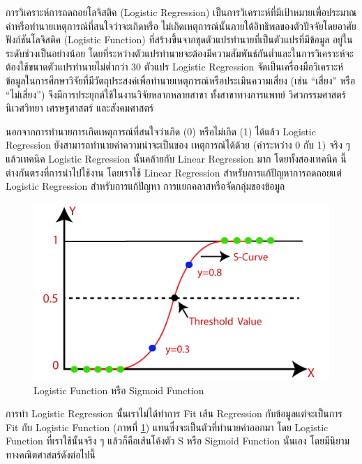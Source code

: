 การวิเคราะห์การถดถอยโลจิสติค (Logistic Regression) เป็นการวิเคราะห์ที่มีเป้าหมายเพื่อประมาณค่าหรือทํานายเหตุการณ์ที่สนใจว่าจะเกิดหรือ%
ไม่เกิดเหตุการณ์นั้นภายใต้อิทธิพลของตัวปัจจัยโดยอาศัยฟังก์ชันโลจิสติค (Logistic Function) ที่สร้างขึ้นจากชุดตัวแปรทำนายที่เป็นตัวแปรที่มีข้อมูล%
อยู่ในระดับช่วงเป็นอย่างน้อย โดยที่ระหว่างตัวแปรทำนายจะต้องมีความสัมพันธ์กันต่ำและในการวิเคราะห์จะต้องใช้ขนาดตัวแปรทำนายไม่ต่ำกว่า 30
ตัวแปร Logistic Regression จัดเป็นเครื่องมือวิเคราะห์ข้อมูลในการศึกษาวิจัยที่มีวัตถุประสงค์เพื่อทํานายเหตุการณ์หรือประเมินความเสี่ยง (เช่น
\enquote{เสี่ยง} หรือ \enquote{ไม่เสี่ยง}) จึงมีการประยุกต์ใช้ในงานวิจัยหลากหลายสาขา ทั้งสาขาทางการแพทย์ วิศวกรรมศาสตร์ นิเวศวิทยา
เศรษฐศาสตร์ และสังคมศาสตร์

นอกจากการทำนายการเกิดเหตุการณ์ที่สนใจว่าเกิด (0) หรือไม่เกิด (1) ได้แล้ว Logistic Regression ยังสามารถทำนายค่าความน่าจะเป็นของ%
เหตุการณ์ได้ด้วย (ค่าระหว่าง 0 กับ 1) จริง ๆ แล้วเทคนิค Logistic Regression นั้นคล้ายกับ Linear Regression มาก โดยทั้งสองเทคนิค%
นี้ต่างกันตรงที่การนำไปใช้งาน โดยเราใช้ Linear Regression สำหรับการแก้ปัญหาการถดถอยแต่ Logistic Regression สำหรับการแก้ปัญหา%
การแยกคลาสหรือจัดกลุ่มของข้อมูล

\begin{figure}[H]
    \centering
    \includegraphics[width=0.8\linewidth]{fig/s_curve_logistic_func.png}
    \caption{Logistic Function หรือ Sigmoid Function}
    \label{fig:s_curve_logistic}
\end{figure}

การทำ Logistic Regression นั้นเราไม่ได้ทำการ Fit เส้น Regression กับข้อมูลแต่จะเป็นการ Fit กับ Logistic Function (ภาพที่
\ref{fig:s_curve_logistic}) แทนซึ่งจะเป็นตัวที่ทำนายค่าออกมา โดย Logistic Function ที่เราใช้นั้นจริง ๆ แล้วก็คือเส้นโค้งตัว S หรือ
Sigmoid Function นั่นเอง โดยมีนิยามทางคณิตศาสตร์ดังต่อไปนี้

